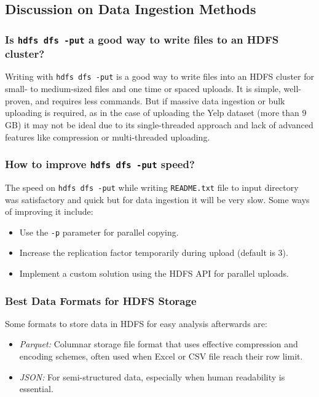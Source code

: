 \documentclass[conference]{IEEEtran}
\begin{document}
\subsection{Discussion on Data Ingestion Methods}

\subsubsection{Is \texttt{hdfs dfs -put} a good way to write files to an HDFS
cluster?}

Writing with \texttt{hdfs dfs -put} is a good way to write files into an HDFS
cluster for small- to medium-sized files and one time or spaced uploads. It is
simple, well-proven, and requires less commands. But if massive data ingestion
or bulk uploading is required, as in the case of uploading the Yelp dataset
(more than 9 GB) it may not be ideal due to its single-threaded approach and lack
of advanced features like compression or multi-threaded uploading.

\subsubsection{How to improve \texttt{hdfs dfs -put} speed?}

The speed on \texttt{hdfs dfs -put} while writing \texttt{README.txt} file to
input directory was satisfactory and quick but for data ingestion it will be very
slow. Some ways of improving it include:
\begin{itemize}
    \item Use the \texttt{-p} parameter for parallel copying.
    \item Increase the replication factor temporarily during upload (default is 3).
    \item Implement a custom solution using the HDFS API for parallel uploads.
\end{itemize}

\subsubsection{Best Data Formats for HDFS Storage}

Some formats to store data in HDFS for easy analysis afterwards are:
\begin{itemize}
    \item \textit{Parquet:} Columnar storage file format that uses effective
    compression and encoding schemes, often used when Excel or CSV file reach
    their row limit.
    \item \textit{JSON:} For semi-structured data, especially when human readability
    is essential.
\end{itemize}
\end{document}
